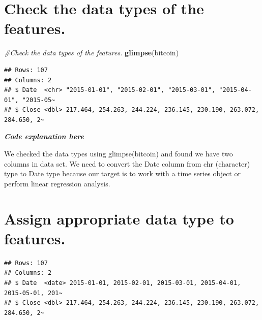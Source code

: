 \documentclass[
]{book}
\newenvironment{Shaded}{\begin{snugshade}}{\end{snugshade}}
\newcommand{\CommentTok}[1]{\textcolor[rgb]{0.56,0.35,0.01}{\textit{#1}}}
\newcommand{\FunctionTok}[1]{\textcolor[rgb]{0.13,0.29,0.53}{\textbf{#1}}}
\newcommand{\NormalTok}[1]{#1}
\newcommand{\OtherTok}[1]{\textcolor[rgb]{0.56,0.35,0.01}{#1}}
\newcommand{\SpecialCharTok}[1]{\textcolor[rgb]{0.81,0.36,0.00}{\textbf{#1}}}
\begin{document}
\section*{Check the data types of the features.}\label{check-the-data-types-of-the-features.}

\begin{Shaded}
\begin{Highlighting}[]
\CommentTok{\#Check the data types of the features.}
\FunctionTok{glimpse}\NormalTok{(bitcoin)}
\end{Highlighting}
\end{Shaded}

\begin{verbatim}
## Rows: 107
## Columns: 2
## $ Date  <chr> "2015-01-01", "2015-02-01", "2015-03-01", "2015-04-01", "2015-05~
## $ Close <dbl> 217.464, 254.263, 244.224, 236.145, 230.190, 263.072, 284.650, 2~
\end{verbatim}

\emph{\textbf{Code explanation here}}

We checked the data types using glimpse(bitcoin) and found we have two columns in data set.
We need to convert the Date column from chr (character) type to Date type because our target is to work with a time series object or perform linear regression analysis.

\section*{Assign appropriate data type to features.}\label{assign-appropriate-data-type-to-features.}

\begin{Shaded}
\end{Shaded}

\begin{verbatim}
## Rows: 107
## Columns: 2
## $ Date  <date> 2015-01-01, 2015-02-01, 2015-03-01, 2015-04-01, 2015-05-01, 201~
## $ Close <dbl> 217.464, 254.263, 244.224, 236.145, 230.190, 263.072, 284.650, 2~
\end{verbatim}
\end{document}
